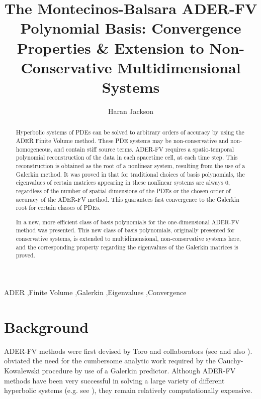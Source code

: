\documentclass[twoside,english,final,5p,times,twocolumn]{elsarticle}
\begin{document}
\begin{frontmatter}{}

\title{The Montecinos-Balsara ADER-FV Polynomial Basis: Convergence Properties
\& Extension to Non-Conservative Multidimensional Systems}

\author{Haran Jackson}


\address{Cavendish Laboratory, JJ Thomson Ave, Cambridge, UK, CB3 0HE}
\begin{abstract}
Hyperbolic systems of PDEs can be solved to arbitrary orders of accuracy
by using the ADER Finite Volume method. These PDE systems may be non-conservative
and non-homogeneous, and contain stiff source terms. ADER-FV requires
a spatio-temporal polynomial reconstruction of the data in each spacetime
cell, at each time step. This reconstruction is obtained as the root
of a nonlinear system, resulting from the use of a Galerkin method.
It was proved in \citet{Jackson2017} that for traditional choices
of basis polynomials, the eigenvalues of certain matrices appearing
in these nonlinear systems are always 0, regardless of the number
of spatial dimensions of the PDEs or the chosen order of accuracy
of the ADER-FV method. This guarantees fast convergence to the Galerkin
root for certain classes of PDEs.

In \citet{Montecinos2017} a new, more efficient class of basis polynomials
for the one-dimensional ADER-FV method was presented. This new class
of basis polynomials, originally presented for conservative systems,
is extended to multidimensional, non-conservative systems here, and
the corresponding property regarding the eigenvalues of the Galerkin
matrices is proved.
\end{abstract}
\begin{keyword}
ADER \sep Finite Volume \sep Galerkin \sep Eigenvalues \sep Convergence
\end{keyword}

\end{frontmatter}{}

\section{Background}

ADER-FV methods were first devised by Toro and collaborators (see
\citet{toro2001towards} and also \citet{toro2002solution,titarev2002ader}).
\citet{Dumbser2008} obviated the need for the cumbersome analytic
work required by the Cauchy-Kowalewski procedure by use of a Galerkin
predictor. Although ADER-FV methods have been very successful in solving
a large variety of different hyperbolic systems (e.g. see \citet{Dumbser2016a,Balsara2009,Hidalgo2011,Zanotti2016}),
they remain relatively computationally expensive.
\end{document}
